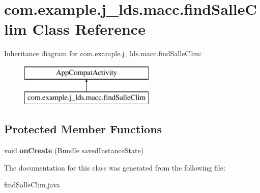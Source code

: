 \hypertarget{classcom_1_1example_1_1j__lds_1_1macc_1_1find_salle_clim}{}\section{com.\+example.\+j\+\_\+lds.\+macc.\+find\+Salle\+Clim Class Reference}
\label{classcom_1_1example_1_1j__lds_1_1macc_1_1find_salle_clim}
Inheritance diagram for com.\+example.\+j\+\_\+lds.\+macc.\+find\+Salle\+Clim\+:\begin{figure}[H]
\begin{center}
\leavevmode
\includegraphics[height=2.000000cm]{classcom_1_1example_1_1j__lds_1_1macc_1_1find_salle_clim}
\end{center}
\end{figure}
\subsection*{Protected Member Functions}
\begin{DoxyCompactItemize}
\item 
\mbox{\label{classcom_1_1example_1_1j__lds_1_1macc_1_1find_salle_clim_a259426547026c522e5a5c6b871ac49db}} 
void {\bfseries on\+Create} (Bundle saved\+Instance\+State)
\end{DoxyCompactItemize}


The documentation for this class was generated from the following file\+:\begin{DoxyCompactItemize}
\item 
find\+Salle\+Clim.\+java\end{DoxyCompactItemize}
